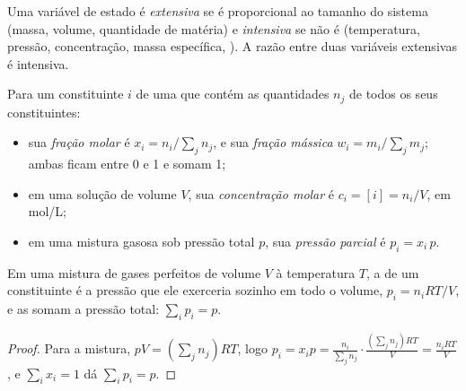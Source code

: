 \begin{definition}\label{def:b1:extent-q-and-k:variables}
Uma variável de estado é \emph{extensiva} se é
proporcional ao tamanho do sistema (massa, volume, quantidade de
matéria) e \emph{intensiva} se não é
(temperatura, pressão, concentração, massa específica, ). A
razão entre duas variáveis extensivas é intensiva.
\end{definition}

\begin{definition}\label{def:b1:extent-q-and-k:composition}
Para um constituinte $i$ de uma  que contém as quantidades $n_j$ de
todos os seus constituintes:
\begin{itemize}
  \item sua \emph{fração molar} é $x_i = n_i/\sum_j
        n_j$, e sua \emph{fração mássica} $w_i =
        m_i/\sum_j m_j$; ambas ficam entre 0 e 1 e somam 1;
  \item em uma solução de volume $V$, sua \emph{concentração
        molar} é $c_i = [i] = n_i/V$,
        em \unit{mol/L};
  \item em uma mistura gasosa sob pressão total $p$, sua \emph{pressão
        parcial} é $p_i = x_i\,p$.
\end{itemize}
\end{definition}

\begin{proposition}\label{prop:b1:extent-q-and-k:dalton}
Em uma mistura de gases perfeitos de volume $V$ à temperatura $T$, a
 de um constituinte é a pressão que ele exerceria sozinho
em todo o volume, $p_i = n_iRT/V$, e as  somam a
pressão total: $\sum_i p_i = p$.
\end{proposition}

\begin{proof}
Para a mistura, $pV = (\sum_j n_j)RT$, logo $p_i = x_i p = \frac{n_i}{\sum_j
n_j}\cdot\frac{(\sum_j n_j)RT}{V} = \frac{n_iRT}{V}$, e $\sum_i x_i = 1$
dá $\sum_i p_i = p$.
\end{proof}

